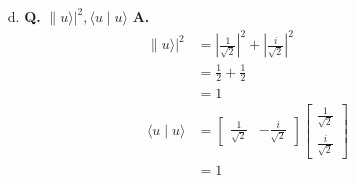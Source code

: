 \documentclass[main.tex]{subfiles}
\begin{document}
\begin{enumerate}
\begin{enumerate}
        \item[d.] \textbf{Q.} $\|u\rangle|^{2},\langle u \mid u\rangle$ \textbf{A.}
        \begin{align*}
            \| u\rangle|^{2}   & = |\frac{1}{\sqrt{2}}|^2 + |\frac{i}{\sqrt{2}}|^2\\
                                    & = \frac{1}{2} + \frac{1}{2} \\
                                    & = 1 \\
            \langle u \mid u\rangle & = \left[\begin{array}{ll} \frac{1}{\sqrt{2}} & -\frac{i}{\sqrt{2}} \end{array}\right] \left[\begin{array}{r} \frac{1}{\sqrt{2}} \\ \frac{i}{\sqrt{2}} \end{array}\right]\\
                                    & = 1
        \end{align*}
        

\end{enumerate}
\end{enumerate}
\end{document}
